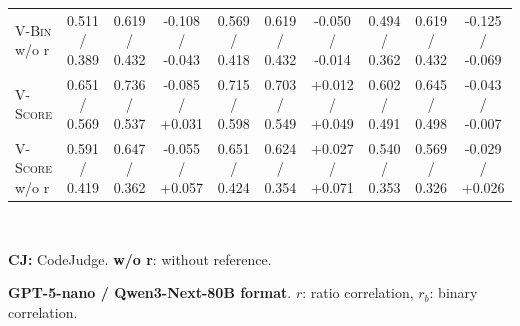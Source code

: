 \begin{table}[t]
\begin{tabular}{@{}
        l|ccc|ccc|ccc@{}}
        \textsc{V-Bin} w/o r    & 0.511 / 0.389   & 0.619 / 0.432   & -0.108 / -0.043                     & 0.569 / 0.418   & 0.619 / 0.432   & -0.050 / -0.014                     & 0.494 / 0.362   & 0.619 / 0.432   & -0.125 / -0.069                     \\
        \textsc{V-Score}        & 0.651 / 0.569   & 0.736 / 0.537   & -0.085 / +0.031                     & 0.715 / 0.598   & 0.703 / 0.549   & +0.012 / +0.049                     & 0.602 / 0.491   & 0.645 / 0.498   & -0.043 / -0.007                     \\
        \textsc{V-Score} w/o r  & 0.591 / 0.419   & 0.647 / 0.362   & -0.055 / +0.057                     & 0.651 / 0.424   & 0.624 / 0.354   & +0.027 / +0.071                     & 0.540 / 0.353   & 0.569 / 0.326   & -0.029 / +0.026                     \\
        \bottomrule
    \end{tabular}\\
    \begin{description}[itemsep=-3pt,topsep=0pt]
        \item \textbf{CJ:} CodeJudge. \hspace{10pt} \textbf{w/o r}: without reference.
        \item \textbf{GPT-5-nano / Qwen3-Next-80B format}. $r$: ratio correlation, $r_b$: binary correlation.
    \end{description}
\end{table}
